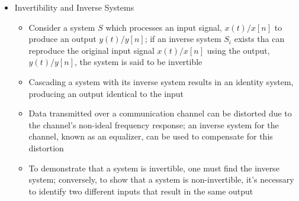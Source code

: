 \begin{itemize}
\begin{itemize}
    \end{itemize}

  \item Invertibility and Inverse Systems

    \begin{itemize}

      \item Consider a system $S$ which processes an input signal, $x(t)/x[n]$ to produce an output $y(t)/y[n]$; if an inverse system $S_i$ exists tha can reproduce the original input signal $x(t)/x[n]$ using the output, $y(t)/y[n]$, the system is said to be invertible

      \item Cascading a system with its inverse system results in an identity system, producing an output identical to the input

      \item Data transmitted over a communication channel can be distorted due to the channel's non-ideal frequency response; an inverse system for the channel, known as an equalizer, can be used to compensate for this distortion

      \item To demonstrate that a system is invertible, one must find the inverse system; conversely, to show that a system is non-invertible, it's necessary to identify two different inputs that result in the same output

    \end{itemize}

\end{itemize}



